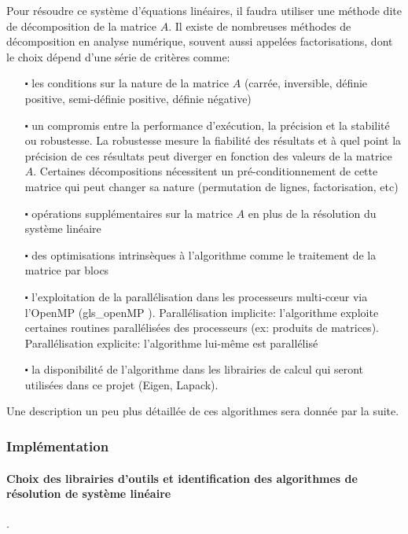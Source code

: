 \documentclass{report}
\begin{document}
Pour résoudre ce système d'équations linéaires, il faudra utiliser une méthode dite de décomposition de la matrice $A$. Il existe de nombreuses méthodes de décomposition en analyse numérique, souvent aussi appelées factorisations, dont le choix dépend d'une série de critères comme:
\begin{itemize}
\item[$\centerdot$] les conditions sur la nature de la matrice $A$ (carrée, inversible, définie positive, semi-définie positive, définie négative)
\item[$\centerdot$] un compromis entre la performance d'exécution, la précision et la stabilité ou robustesse. La robustesse mesure la fiabilité des résultats et à quel point la précision de ces résultats peut diverger en fonction des valeurs de la matrice $A$. Certaines décompositions nécessitent un pré-conditionnement de cette matrice qui peut changer sa nature (permutation de lignes, factorisation, etc)
\item[$\centerdot$] opérations supplémentaires sur la matrice $A$ en plus de la résolution du système linéaire
\item[$\centerdot$] des optimisations intrinsèques à l'algorithme comme le traitement de la matrice par blocs
\item[$\centerdot$] l'exploitation de la parallélisation dans les processeurs multi-cœur via l'OpenMP (\gls{gls_openMP} \cite{bib_openMpWikipedia} \cite{bib_openMPspecs}). Parallélisation implicite: l'algorithme exploite certaines routines parallélisées des processeurs (ex: produits de matrices). Parallélisation explicite: l'algorithme lui-même est parallélisé
\item[$\centerdot$] la disponibilité de l'algorithme dans les librairies de calcul qui seront utilisées dans ce projet (Eigen, Lapack).
\end{itemize}
\medskip
Une description un peu plus détaillée de ces algorithmes sera donnée par  la suite.

\subsubsection{Implémentation}


\paragraph{Choix des librairies d'outils et identification des algorithmes de résolution de système linéaire}.\\
\end{document}
